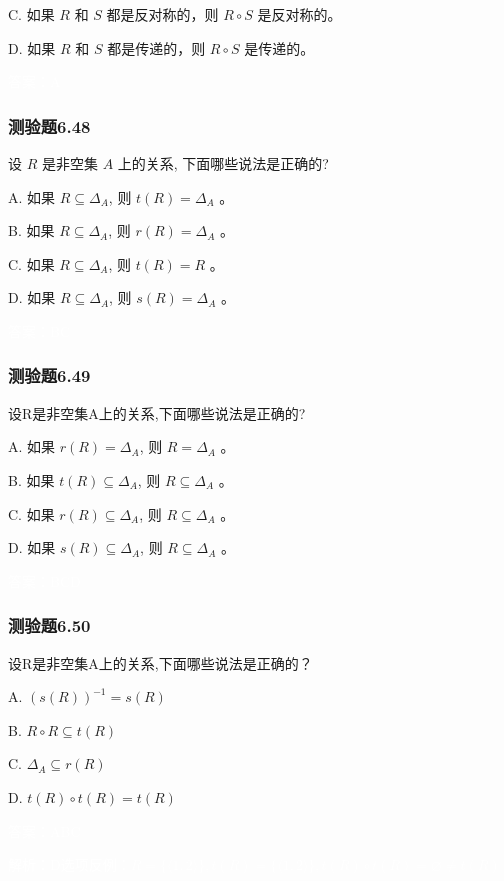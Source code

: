 \documentclass[UTF8, heading=true]{ctexart}
\begin{document}
C. 
如果 $R$ 和 $S$ 都是反对称的，则 $R \circ S$ 是反对称的。

D.  
如果 $R$ 和 $S$ 都是传递的，则 $R \circ S$ 是传递的。

\textcolor{white}{答案：A}

\subsubsection{测验题6.48}

设 $R$ 是非空集 $A$ 上的关系, 下面哪些说法是正确的?

A. 如果 $R \subseteq \Delta_A$, 则 $t(R)=\Delta_A$ 。

B. 
如果 $R \subseteq \Delta_A$, 则 $r(R)=\Delta_A$ 。

C. 
如果 $R \subseteq \Delta_A$, 则 $t(R)=R$ 。

D. 
如果 $R \subseteq \Delta_A$, 则 $s(R)=\Delta_A$ 。

\textcolor{white}{答案：BC}

\subsubsection{测验题6.49}
设R是非空集A上的关系,下面哪些说法是正确的?

A. 如果 $r(R)=\Delta_A$, 则 $R=\Delta_A$ 。

B. 如果 $t(R) \subseteq \Delta_A$, 则 $R \subseteq \Delta_A$ 。

C. 如果 $r(R) \subseteq \Delta_A$, 则 $R \subseteq \Delta_A$ 。

D. 如果 $s(R) \subseteq \Delta_A$, 则 $R \subseteq \Delta_A$ 。

\textcolor{white}{答案：BCD}

\subsubsection{测验题6.50}

设R是非空集A上的关系,下面哪些说法是正确的？

A. $(s(R))^{-1}=s(R)$

B. $R \circ R \subseteq t(R)$

C. $\Delta_A \subseteq r(R)$

D. $t(R) \circ t(R)=t(R)$

\textcolor{white}{答案：ABC}

\textcolor{white}{解析：D选项反例：$R=\{\langle 1,2\rangle \}, t(R)=\{\langle 1,2\rangle \}, t(R) \circ t(R)= \varnothing \neq t(R)$}
\end{document}
